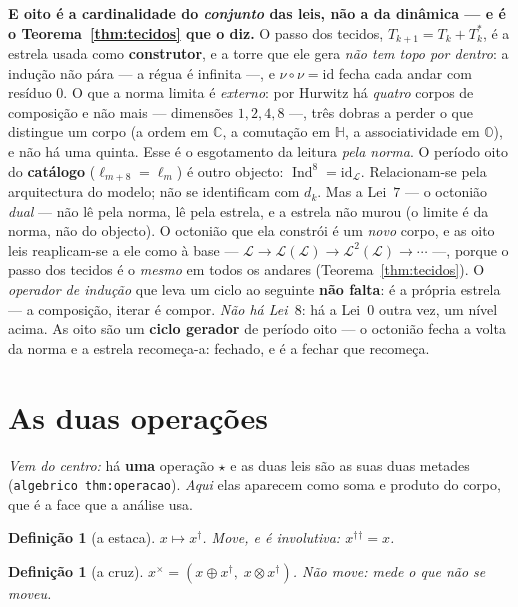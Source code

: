 \documentclass[11pt,a4paper]{article}
\newcommand{\code}[1]{\texttt{\small #1}}
\newtheorem{definicao}[teorema]{Definição}
\newcommand{\dg}{^{\dagger}}
\begin{document}
\smallskip
\noindent \textbf{E oito é a cardinalidade do \emph{conjunto} das leis, não a da dinâmica --- e é o
Teorema~\ref{thm:tecidos} que o diz.} O passo dos tecidos, $T_{k+1}=T_k+T_k^{*}$, é a estrela usada como
\textbf{construtor}, e a torre que ele gera \emph{não tem topo por dentro}: a indução não pára --- a régua
é infinita ---, e $\nu\circ\nu=\mathrm{id}$ fecha cada andar com resíduo $0$. O que a norma limita é
\emph{externo}: por Hurwitz há \emph{quatro} corpos de composição e não mais ---
dimensões $1,2,4,8$ ---, três dobras a perder o que distingue um corpo (a ordem em $\mathbb{C}$, a comutação
em $\mathbb{H}$, a associatividade em $\mathbb{O}$), e não há uma quinta. Esse é o esgotamento da
leitura \emph{pela norma}. O período oito do \textbf{catálogo} ($\ell_{m+8}=\ell_m$) é outro objecto:
$\operatorname{Ind}^{8}=\mathrm{id}_{\mathcal L}$. Relacionam-se pela arquitectura do modelo; não se
identificam com $d_k$. Mas a Lei~$7$ --- o octonião \emph{dual} --- não lê pela
norma, lê pela estrela, e a estrela não murou (o limite é da norma, não do objecto). O octonião que ela
constrói é um \emph{novo} corpo, e as oito leis reaplicam-se a ele como à base ---
$\mathcal L\to\mathcal L(\mathcal L)\to\mathcal L^2(\mathcal L)\to\cdots$ ---, porque o passo dos tecidos é
o \emph{mesmo} em todos os andares (Teorema~\ref{thm:tecidos}). O \emph{operador de indução} que leva um
ciclo ao seguinte \textbf{não falta}: é a própria estrela --- a composição, iterar é compor. \emph{Não há
Lei~$8$}: há a Lei~$0$ outra vez, um nível acima. As oito são um \textbf{ciclo gerador} de período oito
--- o octonião fecha a volta da norma e a estrela recomeça-a: fechado, e é a fechar que recomeça.

\section{As duas operações}\label{sec:duas}

\noindent\emph{Vem do centro:} há \textbf{uma} operação $\star$ e as duas leis são as suas
duas metades (\code{algebrico thm:operacao}). \emph{Aqui} elas aparecem como soma e produto
do corpo, que é a face que a análise usa.

\begin{definicao}[a estaca]
$x\mapsto x\dg$. Move, e é involutiva: $x\dg{}\dg=x$.
\end{definicao}

\begin{definicao}[a cruz]
$x^{\times}=(x\oplus x\dg,\; x\otimes x\dg)$. Não move: \emph{mede o que não se moveu}.
\end{definicao}
\end{document}
